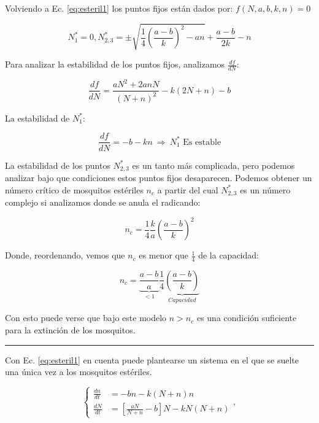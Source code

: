 \documentclass[twocolumn,aps,prl]{revtex4-1}
\newcommand{\Nstar}{N^*}
\newcommand*\sepline{%
  \begin{center}
    \rule[1ex]{.5\textwidth}{.5pt}
  \end{center}}
\begin{document}
Volviendo a Ec. \ref{eq:esteril1} los puntos fijos están dados por: $f(N,a,b,k,n) = 0$

$$
\Nstar_1 = 0, 
\Nstar_{2,3} = \pm 
\sqrt{
    \frac{1}{4} \left( \frac{a-b}{k} \right)^2 - a n 
    }
+ \frac{a-b}{2k} 
- n
$$

Para analizar la estabilidad de los puntos fijos, analizamos $\frac{d f}{d N}$:

$$
\frac{d f}{d N} = \frac{ aN^2 + 2 a n N}{( N + n )^2}
- k (2N + n) - b 
$$

La estabilidad de $\Nstar_1$:

$$
\frac{d f}{d N} = - b - k  n  
\ \Rightarrow  \ 
\Nstar_1 \text{  Es estable}
$$

La estabilidad de los puntos $\Nstar_{2,3}$ es un tanto más complicada, pero podemos analizar bajo que condiciones estos puntos fijos desaparecen. Podemos obtener un número crítico de mosquitos estériles $n_c$ a partir del cual $\Nstar_{2,3}$ es un número complejo si analizamos donde se anula el radicando:

$$
n_c =  
\frac{1}{4} 
\frac{k}{a} 
\left( \frac{a-b}{k} \right)^2
$$

Donde, reordenando, vemos que $n_c$ es menor que $ \frac{1}{4} $ de la capacidad:

$$
n_c =  
\underbrace{\frac{a-b}{a} }_{<1}
\frac{1}{4} 
\underbrace{\left( \frac{a-b}{k} \right)}_{Capacidad }
$$

Con esto puede verse que bajo este modelo $n > n_c$ es una condición suficiente para la extinción de los mosquitos.

\sepline

Con Ec. \ref{eq:esteril1} en cuenta puede plantearse un sistema en el que se suelte una única vez a los mosquitos estériles.

\begin{equation} \label{eq:unaLiberacion}
    \left\lbrace
    \begin{aligned}
        \frac{d n}{d t}&=  -b n - k (N+n) n \\
        \frac{d N}{d t}&=\left[\frac{a N}{N+n}-b\right] N- k N(N+n)
    \end{aligned}
    \right. ,
\end{equation}

\end{document}

